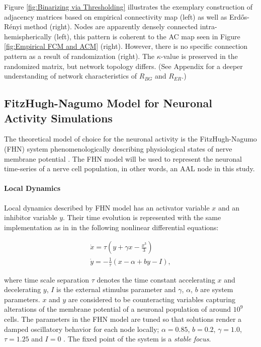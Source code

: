 \documentclass[fleqn,10pt]{wlpeerj}
\begin{document}
Figure \ref{fig:Binarizing via Thresholding} illustrates the exemplary construction of adjacency matrices based on empirical connectivity map (left) as well as Erd\H{o}s-R\'{e}nyi method (right). Nodes are apparently densely connected intra-hemispherically (left), this pattern is coherent to the AC map seen in Figure \ref{fig:Empirical FCM and ACM} (right). However, there is no specific connection pattern as a result of randomization (right). The $\kappa$-value is preserved in the randomized matrix, but network topology differs. (See Appendix for a deeper understanding of network characteristics of $R_{BG}$ and $R_{ER}$.)   



\subsection*{FitzHugh-Nagumo Model for Neuronal Activity Simulations}

The theoretical model of choice for the neuronal activity is the FitzHugh-Nagumo (FHN) system phenomenologically describing physiological states of nerve membrane potential \citep{FIT61, NAG62}. The FHN model will be used to represent the neuronal time-series of a nerve cell population, in other words, an AAL node in this study. 

\paragraph{Local Dynamics}
Local dynamics described by FHN model has an activator variable $x$ and an inhibitor variable $y$. Their time evolution is represented with the same implementation as in \cite{GHO08, GHO08a} in the following nonlinear differential equations:

\begin{subequations}
\begin{align}\dot{x} = \tau \left( y + \gamma x - \frac{x^3}{3} \right)  \label{eqn: frobenius 1}\\  \dot{y} = -\frac{1}{\tau} (x - \alpha + b y - I ) , \label{eqn: frobenius 2}   \end{align} 
\end{subequations}

where time scale separation $\tau$ denotes the time constant accelerating $x$ and decelerating $y$, $I$ is the external stimulus parameter and $\gamma$, $\alpha$, $b$ are system parameters. $x$ and $y$ are considered to be counteracting variables capturing alterations of the membrane potential of a neuronal population of around $10^9$ cells. The parameters in the FHN model are tuned so that solutions render a damped oscillatory behavior for each node locally;  $\alpha = 0.85$, $b=0.2$, $\gamma=1.0$, $\tau=1.25$ and $I=0$ \citep{VUK13}. The fixed point of the system is a \textit{stable focus}.
\end{document}
